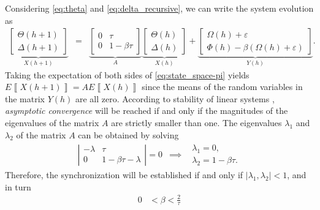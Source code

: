 \documentclass[10pt,journal,compsoc]{IEEEtran}
\newcommand{\expected}[1]{E\!\left\llbracket #1 \right\rrbracket}
\begin{document}
Considering \eqref{eq:theta} and \eqref{eq:delta_recursive}, we can write the 
system evolution as
\begin{eqnarray}
\underset{X(h+1)}{
	\underbrace{
		\left[\!\!\!\begin{array}{c}
		\Theta(h\!+\!1)\\
		\Delta(h\!+\!1)
		\end{array}\!\!\!\right]
	}
} &\!\!\!\!\!\!\! =\!\!\!\!\!\!\! & 
\underset{A}{
	\underbrace{
		\left[\!\!\!\begin{array}{cc}
		0 & \tau\\
		0 & 1\!-\!\beta\tau
		\end{array}\!\!\!\right]
	}
}
\underset{X(h)}{
	\underbrace{
		\left[\!\!\!\begin{array}{c}
		\Theta(\!h\!)\\
		\Delta(\!h\!)
		\end{array}\!\!\!\right]}
}
\!\!+\!\!
\underset{Y(h)}{
	\underbrace{
		\left[\!\!\!\begin{array}{c}
		\Omega(h)+\varepsilon\\
		\Phi(\!h\!)\!-\!\beta(\Omega(\!h\!)\!+\!\varepsilon)
		\end{array}\!\!\!\right]}
}.\label{eq:state_space-pi}
\end{eqnarray}
Taking the expectation of both sides of \eqref{eq:state_space-pi} yields 
$\expected{X(h+1)} = A\expected{X(h)}$ since 
the means of the random variables in the matrix $Y(h)$ are all zero. According 
to stability of linear systems \cite{book-luenberger}, \emph{asymptotic 
	convergence} will be reached if and only if the magnitudes of the 
eigenvalues of the matrix $A$ are strictly smaller than one. The eigenvalues 
$\lambda_1$ and $\lambda_2$ of the matrix $A$ can be obtained 
by solving
\begin{eqnarray}
\left|\begin{array}{cc}
-\lambda & \tau\\
0 & 1-\beta\tau-\lambda
\end{array}\right|=0 &\implies& 
\begin{array}{c}
\lambda_1 = 0,\\
\lambda_2 = 1-\beta\tau.  
\end{array}\label{eq:eigens}
\end{eqnarray}
Therefore, the synchronization will be  established if 
and only if $|\lambda_1,\lambda_2|<1$, and in turn
\begin{align}
0 & <\beta<\frac{2}{\tau}\label{eq:step_size_bounds-pi}
\end{align}
\end{document}
